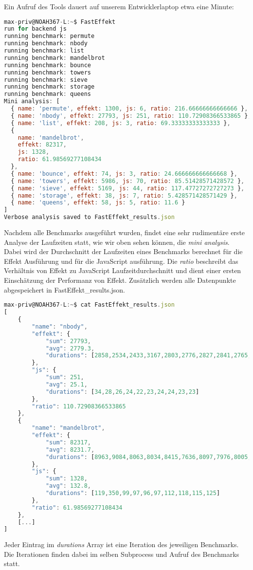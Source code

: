 Ein Aufruf des Tools dauert auf unserem Entwicklerlaptop etwa eine Minute:
\begin{lstlisting}[language=JavaScript]
max-priv@NOAH367-L:~$ FastEffekt
run for backend js
running benchmark: permute
running benchmark: nbody
running benchmark: list
running benchmark: mandelbrot
running benchmark: bounce
running benchmark: towers
running benchmark: sieve
running benchmark: storage
running benchmark: queens
Mini analysis: [
  { name: 'permute', effekt: 1300, js: 6, ratio: 216.66666666666666 },
  { name: 'nbody', effekt: 27793, js: 251, ratio: 110.72908366533865 },
  { name: 'list', effekt: 208, js: 3, ratio: 69.33333333333333 },
  {
    name: 'mandelbrot',
    effekt: 82317,
    js: 1328,
    ratio: 61.98569277108434
  },
  { name: 'bounce', effekt: 74, js: 3, ratio: 24.666666666666668 },
  { name: 'towers', effekt: 5986, js: 70, ratio: 85.51428571428572 },
  { name: 'sieve', effekt: 5169, js: 44, ratio: 117.47727272727273 },
  { name: 'storage', effekt: 38, js: 7, ratio: 5.428571428571429 },
  { name: 'queens', effekt: 58, js: 5, ratio: 11.6 }
]
Verbose analysis saved to FastEffekt_results.json
\end{lstlisting}

Nachdem alle Benchmarks ausgeführt wurden, findet eine sehr rudimentäre erste Analyse der Laufzeiten statt, wie wir oben sehen können, die \textit{mini analysis}. Dabei wird der Durchschnitt der Laufzeiten eines Benchmarks berechnet für die Effekt Ausführung und für die JavaScript ausführung.
Die \textit{ratio} beschreibt das Verhältnis von Effekt zu JavaScript Laufzeitdurchschnitt und dient einer ersten Einschätzung der Performanz von Effekt.
Zusätzlich werden alle Datenpunkte abgespeichert in FastEffekt\_results.json.

\begin{lstlisting}[language=javascript]
max-priv@NOAH367-L:~$ cat FastEffekt_results.json 
[
    {
        "name": "nbody",
        "effekt": {
            "sum": 27793,
            "avg": 2779.3,
            "durations": [2858,2534,2433,3167,2803,2776,2827,2841,2765,2789]
        },
        "js": {
            "sum": 251,
            "avg": 25.1,
            "durations": [34,28,26,24,22,23,24,24,23,23]
        },
        "ratio": 110.72908366533865
    },
    {
        "name": "mandelbrot",
        "effekt": {
            "sum": 82317,
            "avg": 8231.7,
            "durations": [8963,9084,8063,8034,8415,7636,8097,7976,8005,8044]
        },
        "js": {
            "sum": 1328,
            "avg": 132.8,
            "durations": [119,350,99,97,96,97,112,118,115,125]
        },
        "ratio": 61.98569277108434
    },
    [...]
]
\end{lstlisting}
Jeder Eintrag im \textit{durations} Array ist eine Iteration des jeweiligen Benchmarks. Die Iterationen finden dabei im selben Subprocess und Aufruf des Benchmarks statt.

